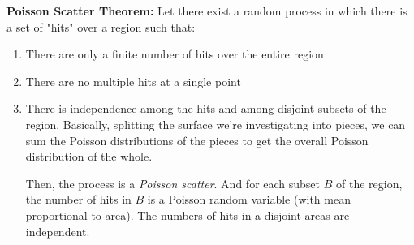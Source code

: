 \documentclass[titlepage, 12pt, leqno]{article}
\begin{document}
\begin{definition}
    \textbf{Poisson Scatter Theorem:}
    Let there exist a random process in which there is a set of "hits" over a
    region such that:
    \begin{enumerate}
        \item There are only a finite number of hits over the entire region
        \item There are no multiple hits at a single point
        \item There is independence among the hits and among disjoint subsets of
            the region. Basically, splitting the surface we're investigating into
            pieces, we can sum the Poisson distributions of the pieces to get the
            overall Poisson distribution of the whole.
            \vspace{10px}
            
        Then, the process is a \textit{Poisson scatter}. And for each subset $B$
        of the region, the number of hits in $B$ is a Poisson random variable 
        (with mean proportional to area). The numbers of hits in a disjoint areas
        are independent.
    \end{enumerate}
\end{definition}
\end{document}
